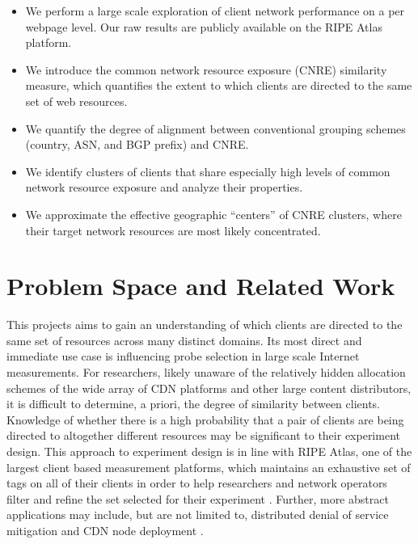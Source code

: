 \begin{itemize}%
    \item We perform a large scale exploration of client network performance on a per webpage level. Our
        raw results are publicly available on the RIPE Atlas platform.
    \item We introduce the common network resource exposure (CNRE) similarity
        measure, which quantifies the extent to which clients are directed to
        the same set of web resources.
    \item  We quantify the degree of alignment between conventional grouping schemes (country, ASN, and BGP prefix)
        and CNRE.
    \item We identify clusters of clients that share especially high levels of
        common network resource exposure and analyze their properties.
    \item We approximate the effective geographic ``centers'' of CNRE clusters,
        where their target network resources are most likely concentrated.
\end{itemize}

\section{Problem Space and Related Work} \label{skyspace}

This projects aims to gain an understanding of which clients are directed to the same set of
resources across many distinct domains. Its most direct and immediate use case is influencing probe
selection in large scale Internet measurements. For researchers, likely unaware of the relatively
hidden allocation schemes of the wide array of CDN platforms and other large content distributors,
it is difficult to determine, a priori, the degree of similarity between clients. Knowledge of
whether there is a high probability that a pair of clients are being directed to altogether
different resources may be significant to their experiment design. This approach to experiment
design is in line with RIPE Atlas, one of the largest client based measurement platforms,
which maintains
an exhaustive set of tags on all of their clients in order to help researchers and network operators
filter and refine the set selected for their experiment \cite{ripe-atlas}. Further, more abstract
applications may include, but are not limited to, distributed denial of service mitigation
\cite{anycastvsddos} and CDN node deployment \cite{35590, Tariq}.

